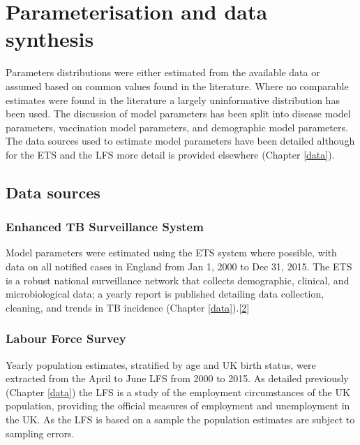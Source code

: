 \documentclass[11pt,twoside]{bristolthesis}
\begin{document}
  \hypertarget{parameterisation-and-data-synthesis}{%
  \section{Parameterisation and data synthesis}\label{parameterisation-and-data-synthesis}}
  
  Parameters distributions were either estimated from the available data or assumed based on common values found in the literature. Where no comparable estimates were found in the literature a largely uninformative distribution has been used. The discussion of model parameters has been split into disease model parameters, vaccination model parameters, and demographic model parameters. The data sources used to estimate model parameters have been detailed although for the ETS and the LFS more detail is provided elsewhere (Chapter \ref{data}).
  
  \hypertarget{data-sources-1}{%
  \subsection{Data sources}\label{data-sources-1}}
  
  \hypertarget{enhanced-tb-surveillance-system}{%
  \subsubsection{Enhanced TB Surveillance System}\label{enhanced-tb-surveillance-system}}
  
  Model parameters were estimated using the ETS system where possible, with data on all notified cases in England from Jan 1, 2000 to Dec 31, 2015. The ETS is a robust national surveillance network that collects demographic, clinical, and microbiological data; a yearly report is published detailing data collection, cleaning, and trends in TB incidence (Chapter \ref{data}).{[}\protect\hyperlink{ref-PHE2017}{2}{]}
  
  \hypertarget{labour-force-survey}{%
  \subsubsection{Labour Force Survey}\label{labour-force-survey}}
  
  Yearly population estimates, stratified by age and UK birth status, were extracted from the April to June LFS from 2000 to 2015. As detailed previously (Chapter \ref{data}) the LFS is a study of the employment circumstances of the UK population, providing the official measures of employment and unemployment in the UK. As the LFS is based on a sample the population estimates are subject to sampling errors.
  
\end{document}
